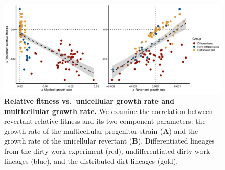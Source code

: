 \documentclass[
]{book}
\begin{document}
\begin{figure}
\centering
\includegraphics{images/Figure_S9_Relative_fitness_vs_uni_growth_rate_and_multi_growth_rate_12OCT22.png}
\caption{\label{fig:Relative-fitness-vs-uni-and-multi-growth-rates}\textbf{Relative fitness vs.~unicellular growth rate and multicellular growth rate.} We examine the correlation between revertant relative fitness and its two component parameters: the growth rate of the multicellular progenitor strain (\textbf{A}) and the growth rate of the unicellular revertant (\textbf{B}). Differentiated lineages from the dirty-work experiment (red), undifferentiated dirty-work lineages (blue), and the distributed-dirt lineages (gold).}
\end{figure}

  
\end{document}

